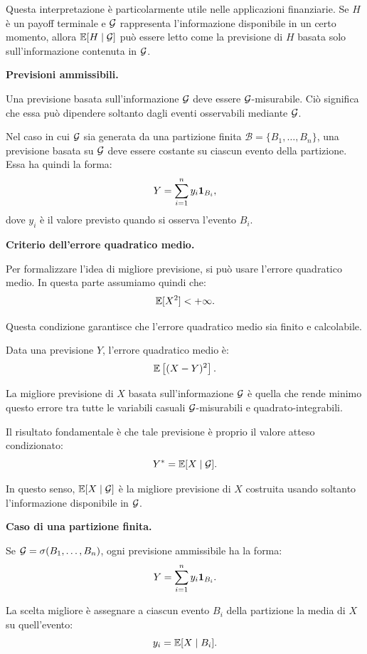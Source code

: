Questa interpretazione \`{e} particolarmente utile nelle applicazioni
finanziarie. Se $H$ \`{e} un payoff terminale e $\mathcal{G}$ rappresenta
l'informazione disponibile in un certo momento, allora
$\mathbb{E}[H\mid\mathcal{G}]$ pu\`{o} essere letto come la previsione di $H$
basata solo sull'informazione contenuta in $\mathcal{G}$.

\medskip

\noindent
\textbf{Previsioni ammissibili.}

Una previsione basata sull'informazione $\mathcal{G}$ deve essere
$\mathcal{G}$-misurabile. Ci\`{o} significa che essa pu\`{o} dipendere soltanto
dagli eventi osservabili mediante $\mathcal{G}$.

Nel caso in cui $\mathcal{G}$ sia generata da una partizione finita
$\mathcal{B}=\{B_1,\ldots,B_n\}$, una previsione basata su $\mathcal{G}$ deve
essere costante su ciascun evento della partizione. Essa ha quindi la forma:
\[
Y
=
\sum_{i=1}^{n}
y_i\mathbf{1}_{B_i},
\]
dove $y_i$ \`{e} il valore previsto quando si osserva l'evento $B_i$.

\medskip

\noindent
\textbf{Criterio dell'errore quadratico medio.}

Per formalizzare l'idea di migliore previsione, si pu\`{o} usare l'errore
quadratico medio. In questa parte assumiamo quindi che:
\[
\mathbb{E}[X^2]<+\infty.
\]

Questa condizione garantisce che l'errore quadratico medio sia finito e
calcolabile.

Data una previsione $Y$, l'errore quadratico medio \`{e}:
\[
\mathbb{E}\left[(X-Y)^2\right].
\]

La migliore previsione di $X$ basata sull'informazione $\mathcal{G}$ \`{e}
quella che rende minimo questo errore tra tutte le variabili casuali
$\mathcal{G}$-misurabili e quadrato-integrabili.

Il risultato fondamentale \`{e} che tale previsione \`{e} proprio il valore
atteso condizionato:
\[
Y^*
=
\mathbb{E}[X\mid\mathcal{G}].
\]

In questo senso, $\mathbb{E}[X\mid\mathcal{G}]$ \`{e} la migliore previsione di
$X$ costruita usando soltanto l'informazione disponibile in $\mathcal{G}$.

\medskip

\noindent
\textbf{Caso di una partizione finita.}

Se $\mathcal{G}=\sigma(B_1,\ldots,B_n)$, ogni previsione ammissibile ha la
forma:
\[
Y
=
\sum_{i=1}^{n}
y_i\mathbf{1}_{B_i}.
\]

La scelta migliore \`{e} assegnare a ciascun evento $B_i$ della partizione la
media di $X$ su quell'evento:
\[
y_i
=
\mathbb{E}[X\mid B_i].
\]

